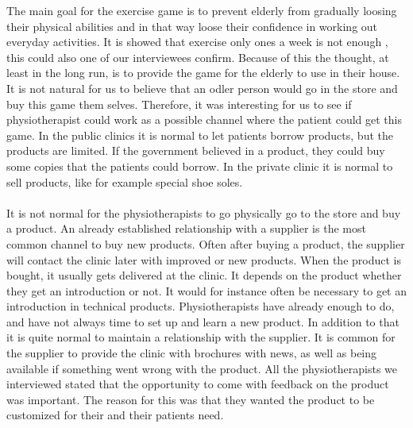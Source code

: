 The main goal for the exercise game is to prevent elderly from gradually loosing their physical abilities and in that way loose their confidence in working out everyday activities. It is showed that exercise only ones a week is not enough \cite{gruppetrening-trheim}, this could also one of our interviewees confirm.  Because of this the thought, at least in the long run, is to provide the game for the elderly to use in their house. It is not natural for us to believe that an odler person would go in the store and buy this game them selves. Therefore, it was interesting for us to see if physiotherapist could work as a possible channel where the patient could get this game. 
In the public clinics it is normal to let patients borrow products, but the products are limited. If the government believed in a product, they could buy some copies that the patients could borrow. In the private clinic it is normal to sell products, like for example special shoe soles. \\ \\
It is not normal for the physiotherapists to go physically go to the store and buy a product. An already established relationship with a supplier is the most common channel to buy new products. Often after buying a product, the supplier will contact the clinic later with improved or new products. When the product is bought, it usually gets delivered at the clinic. It depends on the product whether they get an introduction or not. It would for instance often be necessary to get an introduction in technical products. Physiotherapists have already enough to do, and have not always time to set up and learn a new product. In addition to that it is quite normal to maintain a relationship with the supplier. It is common for the supplier to provide the clinic with brochures with news, as well as being available if something went wrong with the product. All the physiotherapists we interviewed stated that the opportunity to come with feedback on the product was important. The reason for this was that they wanted the product to be customized for their and their patients need. \\ \\
